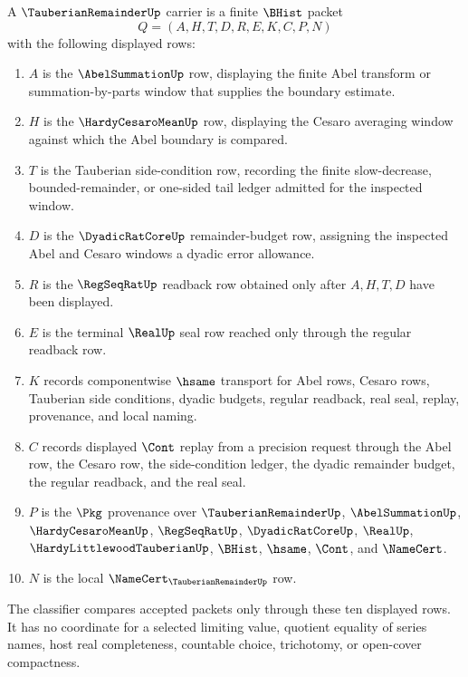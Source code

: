 \begin{definition}
\label{def:tauberian-remainder-carrier}
A $\TauberianRemainderUp$ carrier is a finite $\BHist$ packet
$$
Q=(A,H,T,D,R,E,K,C,P,N)
$$
with the following displayed rows:
\begin{enumerate}
\item $A$ is the $\AbelSummationUp$ row, displaying the finite Abel transform or summation-by-parts window that supplies the boundary estimate.
\item $H$ is the $\HardyCesaroMeanUp$ row, displaying the Cesaro averaging window against which the Abel boundary is compared.
\item $T$ is the Tauberian side-condition row, recording the finite slow-decrease, bounded-remainder, or one-sided tail ledger admitted for the inspected window.
\item $D$ is the $\DyadicRatCoreUp$ remainder-budget row, assigning the inspected Abel and Cesaro windows a dyadic error allowance.
\item $R$ is the $\RegSeqRatUp$ readback row obtained only after $A,H,T,D$ have been displayed.
\item $E$ is the terminal $\RealUp$ seal row reached only through the regular readback row.
\item $K$ records componentwise $\hsame$ transport for Abel rows, Cesaro rows, Tauberian side conditions, dyadic budgets, regular readback, real seal, replay, provenance, and local naming.
\item $C$ records displayed $\Cont$ replay from a precision request through the Abel row, the Cesaro row, the side-condition ledger, the dyadic remainder budget, the regular readback, and the real seal.
\item $P$ is the $\Pkg$ provenance over $\TauberianRemainderUp$, $\AbelSummationUp$, $\HardyCesaroMeanUp$, $\RegSeqRatUp$, $\DyadicRatCoreUp$, $\RealUp$, $\HardyLittlewoodTauberianUp$, $\BHist$, $\hsame$, $\Cont$, and $\NameCert$.
\item $N$ is the local $\NameCert_{\TauberianRemainderUp}$ row.
\end{enumerate}
The classifier compares accepted packets only through these ten displayed rows. It has no coordinate for a selected limiting value, quotient equality of series names, host real completeness, countable choice, trichotomy, or open-cover compactness.
\end{definition}

